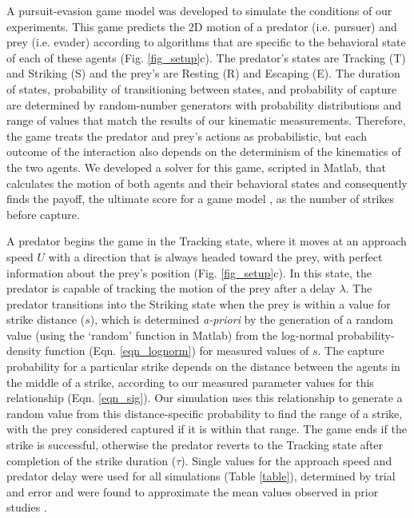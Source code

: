 \documentclass[]{rsos}%
\begin{document}
A pursuit-evasion game model was developed to simulate the conditions of our experiments. 
This game predicts the 2D motion of a predator (i.e. pursuer) and prey (i.e. evader) according to algorithms that are specific to the behavioral state of each of these agents (Fig. \ref{fig_setup}c). 
The predator's states are Tracking (T) and Striking (S) and the prey's are Resting (R) and Escaping (E). 
The duration of states, probability of transitioning between states, and probability of capture are determined by random-number generators with probability distributions and range of values that match the results of our kinematic measurements.
Therefore, the game treats the predator and prey's actions as probabilistic, but each outcome of the interaction also depends on the determinism of the kinematics of the two agents.
We developed a solver for this game, scripted in Matlab, that calculates the motion of both agents and their behavioral states and consequently finds the payoff, the ultimate score for a game model \cite{Isaacs:1965uz}, as the number of strikes before capture.

A predator begins the game in the Tracking state, where it moves at an approach speed $U$ with a direction that is always headed toward the prey, with perfect information about the prey's position (Fig. \ref{fig_setup}c). 
In this state, the predator is capable of tracking the motion of the prey after a delay $\lambda$.
The predator transitions into the Striking state when the prey is within a value for strike distance ($s$), which is determined \textit{a-priori} by the generation of a random value (using the `random' function in Matlab) from the log-normal probability-density function (Eqn. \ref{eqn_lognorm}) for measured values of $s$.
The capture probability for a particular strike depends on the distance between the agents in the middle of a strike, according to our measured parameter values for this relationship (Eqn. \ref{eqn_sig}).
Our simulation uses this relationship to generate a random value from this distance-specific probability to find the range of a strike, with the prey considered captured if it is within that range.
The game ends if the strike is successful, otherwise the predator reverts to the Tracking state after completion of the strike duration ($\tau$).
Single values for the approach speed and predator delay were used for all simulations (Table \ref{table}), determined by trial and error and were found to approximate the mean values observed in prior studies \cite{McHenry:2005tc, Stewart:2013bha}. 
\end{document}
